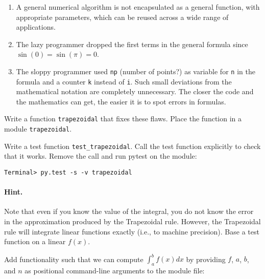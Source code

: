 \documentclass[graybox,sectrefs,envcountresetchap,open=right,final]{svmonodo}
\newenvironment{doconceexercise}{}{}
\begin{document}
\begin{doconceexercise}
\begin{enumerate}
\item A general numerical algorithm is not encapsulated as a general function, with appropriate parameters, which can be reused across a wide range of applications.

\item The lazy programmer dropped the first terms in the general formula since $\sin(0)=\sin(\pi)=0$.

\item The sloppy programmer used \texttt{np} (number of points?) as variable for \texttt{n} in the formula and a counter \texttt{k} instead of \texttt{i}. Such small deviations from the mathematical notation are completely unnecessary. The closer the code and the mathematics can get, the easier it is to spot errors in formulas.
\end{enumerate}

\noindent
Write a function \texttt{trapezoidal} that fixes these flaws.
Place the function in a module \texttt{trapezoidal}.


Write a test function \Verb!test_trapezoidal!. Call the test function
explicitly to check that it works. Remove the call and run pytest
on the module:



\begin{Verbatim}[frame=lines,label=\fbox{{\tiny Terminal}},framesep=2.5mm,framerule=0.7pt,fontsize=\fontsize{9pt}{9pt}]
Terminal> py.test -s -v trapezoidal

\end{Verbatim}



\paragraph{Hint.}
Note that even if you know the value of the integral, you do not know
the error in the approximation produced by the Trapezoidal rule.
However, the Trapezoidal rule will integrate linear functions
exactly (i.e., to machine precision). Base a test function
on a linear $f(x)$.



Add functionality such that we can compute $\int_a^b f(x)dx$ by providing
$f$, $a$, $b$, and $n$ as positional command-line arguments to the
module file:




\end{doconceexercise}
\end{document}
